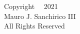 \pagestyle{plain}
\setcounter{page}{2}

\begingroup
\centering
\null
\vfill
Copyright ~{\sffamily\textcopyright}~2021
\\[0.5em]
Mauro J. Sanchirico III
\\[0.5em]
All Rights Reserved
\vfill
\par
\endgroup
